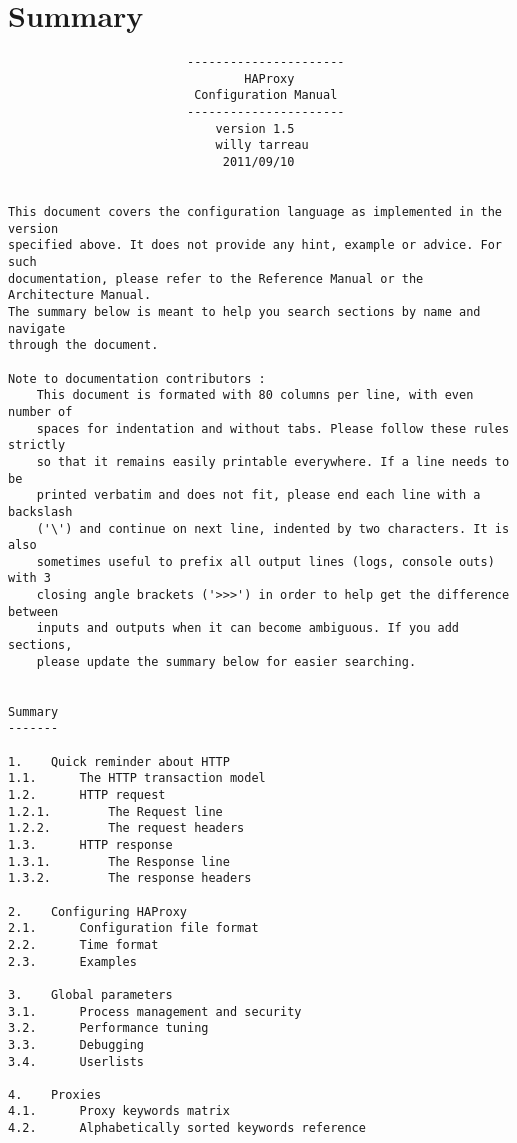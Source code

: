 
\chapter*{Summary}

\begin{verbatim}
                         ----------------------
                                 HAProxy
                          Configuration Manual
                         ----------------------
                             version 1.5
                             willy tarreau
                              2011/09/10


This document covers the configuration language as implemented in the version
specified above. It does not provide any hint, example or advice. For such
documentation, please refer to the Reference Manual or the Architecture Manual.
The summary below is meant to help you search sections by name and navigate
through the document.

Note to documentation contributors :
    This document is formated with 80 columns per line, with even number of
    spaces for indentation and without tabs. Please follow these rules strictly
    so that it remains easily printable everywhere. If a line needs to be
    printed verbatim and does not fit, please end each line with a backslash
    ('\') and continue on next line, indented by two characters. It is also
    sometimes useful to prefix all output lines (logs, console outs) with 3
    closing angle brackets ('>>>') in order to help get the difference between
    inputs and outputs when it can become ambiguous. If you add sections,
    please update the summary below for easier searching.


Summary
-------

1.    Quick reminder about HTTP
1.1.      The HTTP transaction model
1.2.      HTTP request
1.2.1.        The Request line
1.2.2.        The request headers
1.3.      HTTP response
1.3.1.        The Response line
1.3.2.        The response headers

2.    Configuring HAProxy
2.1.      Configuration file format
2.2.      Time format
2.3.      Examples

3.    Global parameters
3.1.      Process management and security
3.2.      Performance tuning
3.3.      Debugging
3.4.      Userlists

4.    Proxies
4.1.      Proxy keywords matrix
4.2.      Alphabetically sorted keywords reference


\end{verbatim}
